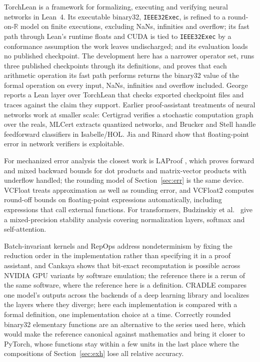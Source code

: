 \documentclass[11pt]{article}
\theoremstyle{plain}
\theoremstyle{definition}
\newcommand{\code}[1]{\texttt{#1}}
\begin{document}
TorchLean \cite{torchlean} is a framework for formalizing, executing and
verifying neural networks in Lean~4. Its executable binary32,
\code{IEEE32Exec}, is refined to a round-on-$\mathbb{R}$ model on finite
executions, excluding NaNs, infinities and overflow; its fast path through
Lean's runtime floats and CUDA is tied to \code{IEEE32Exec} by a conformance
assumption the work leaves undischarged; and its evaluation loads no published
checkpoint. The development here has a narrower operator set, runs three
published checkpoints through its definitions, and proves that each arithmetic
operation its fast path performs returns the binary32 value of the formal
operation on every input, NaNs, infinities and overflow included. George
\cite{torchleancheck} reports a Lean layer over TorchLean that checks exported
checkpoint files and traces against the claim they support. Earlier
proof-assistant treatments of neural networks work at smaller scale: Certigrad
\cite{certigrad} verifies a stochastic computation graph over the reals, MLCert
\cite{mlcert} extracts quantized networks, and Brucker and Stell \cite{brucker}
handle feedforward classifiers in Isabelle/HOL. Jia and Rinard \cite{jiarinard}
show that floating-point error in network verifiers is exploitable.

For mechanized error analysis the closest work is LAProof \cite{laproof}, which
proves forward and mixed backward bounds for dot products and matrix-vector
products with underflow handled; the rounding model of Section~\ref{sec:err} is
the same device. VCFloat \cite{vcfloat} treats approximation as well as
rounding error, and VCFloat2 \cite{vcfloat2} computes round-off bounds on
floating-point expressions automatically, including expressions that call
external functions. For transformers, Budzinskiy et al.\ \cite{budzinskiy} give a
mixed-precision stability analysis covering normalization layers, softmax and
self-attention.

Batch-invariant kernels \cite{tinker2025} and RepOps \cite{gensyn2025} address
nondeterminism by fixing the reduction order in the implementation rather than
specifying it in a proof assistant, and Cankaya \cite{bitexact} shows that
bit-exact recomputation is possible across NVIDIA GPU variants by software
emulation; the reference there is a rerun of the same software, where the
reference here is a definition. CRADLE \cite{cradle} compares one model's
outputs across the backends of a deep learning library and localizes the layers
where they diverge; here each implementation is compared with a formal
definition, one implementation choice at a time. Correctly rounded binary32 elementary
functions \cite{rlibm32,coremath} are an alternative to the series used here,
which would make the reference canonical against mathematics and bring it
closer to PyTorch, whose functions stay within a few units in the last place
where the compositions of Section~\ref{sec:exh} lose all relative accuracy.
\end{document}
